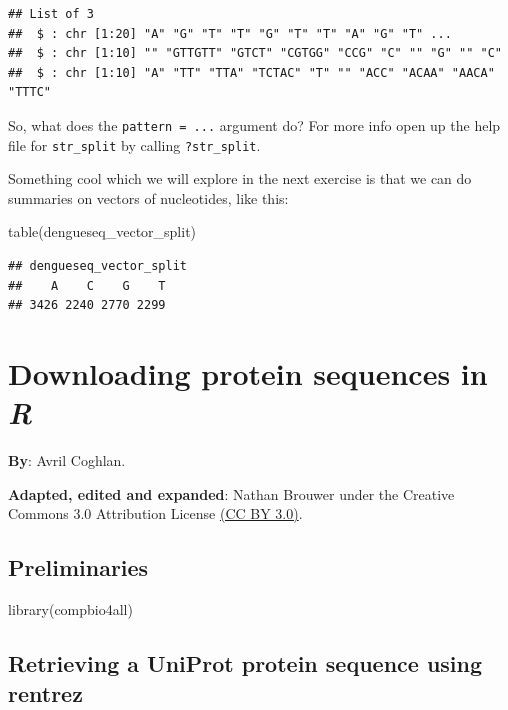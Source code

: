\documentclass[
]{book}
\newenvironment{Shaded}{\begin{snugshade}}{\end{snugshade}}
\newcommand{\FunctionTok}[1]{\textcolor[rgb]{0.00,0.00,0.00}{#1}}
\newcommand{\NormalTok}[1]{#1}
\begin{document}
\begin{verbatim}
## List of 3
##  $ : chr [1:20] "A" "G" "T" "T" "G" "T" "T" "A" "G" "T" ...
##  $ : chr [1:10] "" "GTTGTT" "GTCT" "CGTGG" "CCG" "C" "" "G" "" "C"
##  $ : chr [1:10] "A" "TT" "TTA" "TCTAC" "T" "" "ACC" "ACAA" "AACA" "TTTC"
\end{verbatim}

So, what does the \texttt{pattern\ =\ ...} argument do? For more info open up the help file for \texttt{str\_split} by calling \texttt{?str\_split}.

Something cool which we will explore in the next exercise is that we can do summaries on vectors of nucleotides, like this:

\begin{Shaded}
\begin{Highlighting}[]
\FunctionTok{table}\NormalTok{(dengueseq\_vector\_split)}
\end{Highlighting}
\end{Shaded}

\begin{verbatim}
## dengueseq_vector_split
##    A    C    G    T 
## 3426 2240 2770 2299
\end{verbatim}

\hypertarget{downloading-protein-sequences-in-r}{%
\chapter{\texorpdfstring{Downloading protein sequences in \emph{R}}{Downloading protein sequences in R}}\label{downloading-protein-sequences-in-r}}

\textbf{By}: Avril Coghlan.

\textbf{Adapted, edited and expanded}: Nathan Brouwer under the Creative Commons 3.0 Attribution License \href{https://creativecommons.org/licenses/by/3.0/}{(CC BY 3.0)}.

\hypertarget{preliminaries-3}{%
\section{Preliminaries}\label{preliminaries-3}}

\begin{Shaded}
\begin{Highlighting}[]
\FunctionTok{library}\NormalTok{(compbio4all)}
\end{Highlighting}
\end{Shaded}

\hypertarget{retrieving-a-uniprot-protein-sequence-using-rentrez}{%
\section{Retrieving a UniProt protein sequence using rentrez}\label{retrieving-a-uniprot-protein-sequence-using-rentrez}}
\end{document}
